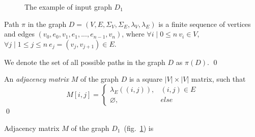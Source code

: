 \begin{figure}[h]
    \centering        
    \caption{The example of input graph $D_1$}
    \label{fig:example_input_graph}
\end{figure}

\begin{definition}
Path $\pi$ in the graph $D=(V, E, \Sigma_V, \Sigma_E, \lambda_V, \lambda_E)$ is a finite sequence of vertices and edges $(v_0, e_0, v_1, e_1, ..., e_{n-1}, v_{n})$, where $\forall i \mid 0 \leq n ~ v_i \in V$, $\forall j \mid 1 \leq j \leq n ~ e_j=(v_j, v_{j+1}) \in E$.

We denote the set of all possible paths in the graph $D$ as $\pi(D)$. \qed 
\end{definition}

\begin{definition}
An \emph{adjacency matrix} $M$ of the graph $D$ is a square $|V|\times|V|$ matrix, such that 
\begin{equation*}
M[i,j] =
 \begin{cases}
   \lambda_E((i, j)), & (i, j) \in E\\
   \varnothing, & else
 \end{cases}
\end{equation*} \qed
\end{definition}

Adjacency matrix $M$ of the graph $D_1$~(fig.~\ref{fig:example_input_graph}) is

